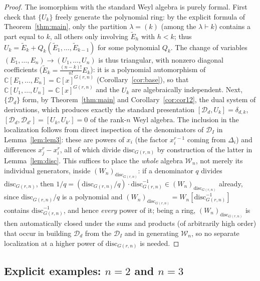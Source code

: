 \documentclass[10pt,a4paper]{amsart}
\newcommand{\CC}{\mathbb{C}}
\begin{document}
\begin{proof}
The isomorphism with the standard Weyl algebra is purely formal. First check that $\{U_k\}$ freely generate the polynomial ring: by the explicit formula of Theorem~\ref{thm:main}, only the partition $\lambda=(k)$ (among the $\lambda\vdash k$) contains a part equal to $k$, all others only involving $\widetilde E_h$ with $h<k$; thus $U_k=\widetilde E_k+Q_k(\widetilde E_1,\dots,\widetilde E_{k-1})$ for some polynomial $Q_k$. The change of variables $(E_1,\dots,E_n)\to(U_1,\dots,U_n)$ is thus triangular, with nonzero diagonal coefficients ($\widetilde E_k=\frac{(n-k)!}{n!}E_k$): it is a polynomial automorphism of $\CC[E_1,\dots,E_n]=\CC[x]^{G(r,n)}$ (Corollary~\ref{cor:base}), so that $\CC[U_1,\dots,U_n]=\CC[x]^{G(r,n)}$ and the $U_k$ are algebraically independent. Next, $\{\mathcal D_d\}$ form, by Theorem~\ref{thm:main} and Corollary~\ref{cor:cor12}, the dual system of derivations, which produces exactly the standard presentation $[\mathcal D_d,U_k]=\delta_{d,k}$, $[\mathcal D_d,\mathcal D_{d'}]=[U_k,U_{k'}]=0$ of the rank-$n$ Weyl algebra. The inclusion in the localization follows from direct inspection of the denominators of $\mathcal D_I$ in Lemma~\ref{lem:lem3}: these are powers of $x_i$ (the factor $x_i^{r-1}$ coming from $\Delta_i$) and differences $x_j^r-x_i^r$, all of which divide $\mathrm{disc}_{G(r,n)}$ by construction of the latter in Lemma~\ref{lem:disc}. This suffices to place the \emph{whole} algebra $\mathcal W_n$, not merely its individual generators, inside $(W_n)_{\mathrm{disc}_{G(r,n)}}$: if a denominator $q$ divides $\mathrm{disc}_{G(r,n)}$, then $1/q=(\mathrm{disc}_{G(r,n)}/q)\cdot\mathrm{disc}_{G(r,n)}^{-1}\in(W_n)_{\mathrm{disc}_{G(r,n)}}$ already, since $\mathrm{disc}_{G(r,n)}/q$ is a polynomial and $(W_n)_{\mathrm{disc}_{G(r,n)}}=W_n[\mathrm{disc}_{G(r,n)}^{-1}]$ contains $\mathrm{disc}_{G(r,n)}^{-1}$, and hence \emph{every} power of it; being a ring, $(W_n)_{\mathrm{disc}_{G(r,n)}}$ is then automatically closed under the sums and products (of arbitrarily high order) that occur in building $\mathcal D_d$ from the $\mathcal D_I$ and in generating $\mathcal W_n$, so no separate localization at a higher power of $\mathrm{disc}_{G(r,n)}$ is needed.
\end{proof}

\subsection{Explicit examples: \texorpdfstring{$n=2$ and $n=3$}{n=2 and n=3}}
\end{document}

